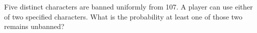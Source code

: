 Five distinct characters are banned uniformly from 107. A player can use either of two specified characters. What is the probability at least one of those two remains unbanned?
